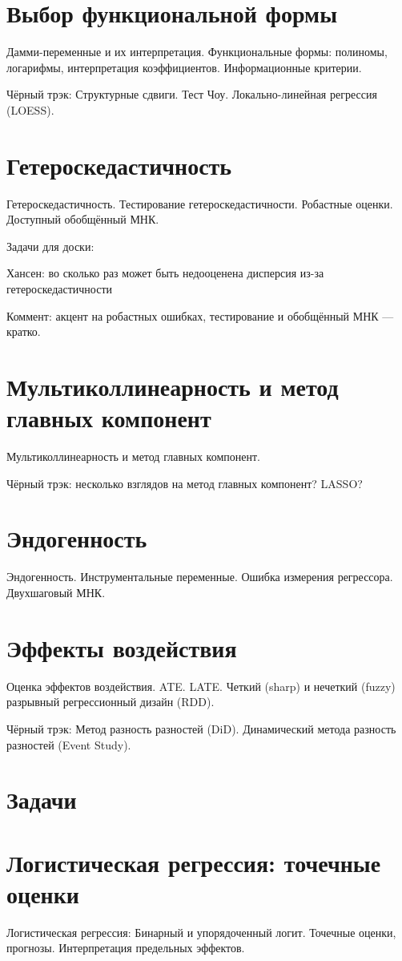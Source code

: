 \documentclass[12pt]{article}
\newcommand{\ESS}{ESS}
\begin{document}
\section{Выбор функциональной формы}
Дамми-переменные и их интерпретация. Функциональные формы: полиномы, логарифмы, интерпретация коэффициентов. Информационные критерии.

Чёрный трэк: Структурные сдвиги. Тест Чоу. Локально-линейная регрессия (LO\ESS).

\section{Гетероскедастичность}
Гетероскедастичность. Тестирование гетероскедастичности. Робастные оценки. Доступный обобщённый МНК.

Задачи для доски:

Хансен: во сколько раз может быть недооценена дисперсия из-за гетероскедастичности


Коммент: акцент на робастных ошибках, тестирование и обобщённый МНК — кратко.

\section{Мультиколлинеарность и метод главных компонент}
Мультиколлинеарность и метод главных компонент.

Чёрный трэк: несколько взглядов на метод главных компонент? LASSO?


\section{Эндогенность}
Эндогенность. Инструментальные переменные. Ошибка измерения регрессора. Двухшаговый МНК.


\section{Эффекты воздействия}
Оценка эффектов воздействия. ATE. LATE. Четкий (sharp) и нечеткий (fuzzy) разрывный регрессионный дизайн (RDD).

Чёрный трэк: Метод разность разностей (DiD). Динамический метода разность разностей (Event Study).

\section{Задачи}

\section{Логистическая регрессия: точечные оценки}
Логистическая регрессия: Бинарный и упорядоченный логит. Точечные оценки, прогнозы.  Интерпретация предельных эффектов.
\end{document}
